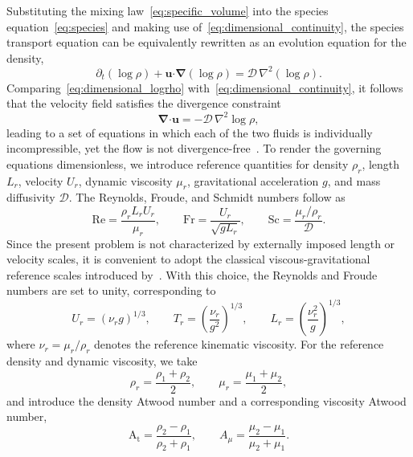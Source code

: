 \documentclass[11pt]{article}
\newcommand{\Atw}{\mathrm{A_t}}
\newcommand{\Sch}{\mathrm{Sc}}
\newcommand{\Frd}{\mathrm{Fr}}
\newcommand{\bnabla}{\boldsymbol{\nabla}}
\newcommand{\bcdot}{\boldsymbol{\cdot}}
\newcommand{\Rey}{\mathrm{Re}}
\begin{document}
Substituting the mixing law~\eqref{eq:specific_volume} into the species equation~\eqref{eq:species} and making use of~\eqref{eq:dimensional_continuity}, the species transport equation can be
equivalently rewritten as an evolution equation for the density,
\begin{equation}
    \label{eq:dimensional_logrho}
    \partial_t \left(\log \rho\right) + \boldsymbol{u}\bcdot\bnabla \left(\log \rho\right) = \mathcal{D}\,\nabla^2 \left(\log \rho\right).
\end{equation}
Comparing~\eqref{eq:dimensional_logrho} with~\eqref{eq:dimensional_continuity}, it follows that the velocity field satisfies the divergence constraint
\begin{equation}
    \bnabla\bcdot\boldsymbol{u} = -\mathcal{D}\,\nabla^2 \log\rho,
\end{equation}
leading to a set of equations in which each of the two fluids is individually incompressible, yet the flow is not divergence-free~\citep{livescu-2013}.
To render the governing equations dimensionless, we introduce reference quantities for density \(\rho_r\), length \(L_r\), velocity \(U_r\), dynamic viscosity \(\mu_r\), gravitational acceleration \(g\), and mass diffusivity \(\mathcal{D}\). The Reynolds, Froude, and Schmidt numbers
follow as
\begin{equation}
    \Rey = \frac{\rho_r L_r U_r}{\mu_r}, \qquad \Frd = \frac{U_r}{\sqrt{g L_r}}, \qquad \Sch = \frac{\mu_r/\rho_r}{\mathcal{D}}.
\end{equation}
Since the present problem is not characterized by externally imposed length or velocity scales, it is convenient to adopt the classical viscous-gravitational reference scales introduced by~\citet{chandrasekhar-1961}. With this choice, the Reynolds and Froude numbers are set to unity, corresponding to
\begin{equation}
    \label{eq:chandrasekhar_scaling}
    U_r = (\nu_r g)^{1/3}, \qquad T_r = \left(\frac{\nu_r}{g^{2}}\right)^{1/3}, \qquad L_r = \left(\frac{\nu_r^{2}}{g}\right)^{1/3},
\end{equation}
where \(\nu_r=\mu_r/\rho_r\) denotes the reference kinematic viscosity. For the reference density and dynamic viscosity, we take
\begin{equation}
    \rho_r = \frac{\rho_1 + \rho_2}{2}, \qquad \mu_r = \frac{\mu_1 + \mu_2}{2},
\end{equation}
and introduce the density Atwood number and a corresponding viscosity Atwood number,
\begin{equation}
    \Atw = \frac{\rho_2 - \rho_1}{\rho_2 + \rho_1}, \qquad A_{\mu} = \frac{\mu_2 - \mu_1}{\mu_2 + \mu_1}.
\end{equation}
\end{document}
